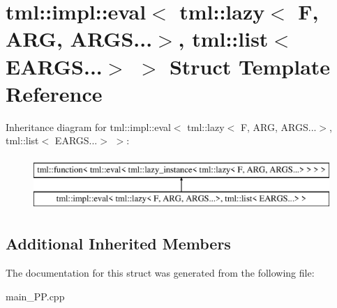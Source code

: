 \hypertarget{structtml_1_1impl_1_1eval_3_01tml_1_1lazy_3_01F_00_01ARG_00_01ARGS_8_8_8_4_00_01tml_1_1list_3_01EARGS_8_8_8_4_01_4}{\section{tml\+:\+:impl\+:\+:eval$<$ tml\+:\+:lazy$<$ F, A\+R\+G, A\+R\+G\+S...$>$, tml\+:\+:list$<$ E\+A\+R\+G\+S...$>$ $>$ Struct Template Reference}
\label{structtml_1_1impl_1_1eval_3_01tml_1_1lazy_3_01F_00_01ARG_00_01ARGS_8_8_8_4_00_01tml_1_1list_3_01EARGS_8_8_8_4_01_4}
}
Inheritance diagram for tml\+:\+:impl\+:\+:eval$<$ tml\+:\+:lazy$<$ F, A\+R\+G, A\+R\+G\+S...$>$, tml\+:\+:list$<$ E\+A\+R\+G\+S...$>$ $>$\+:\begin{figure}[H]
\begin{center}
\leavevmode
\includegraphics[height=2.000000cm]{structtml_1_1impl_1_1eval_3_01tml_1_1lazy_3_01F_00_01ARG_00_01ARGS_8_8_8_4_00_01tml_1_1list_3_01EARGS_8_8_8_4_01_4}
\end{center}
\end{figure}
\subsection*{Additional Inherited Members}


The documentation for this struct was generated from the following file\+:\begin{DoxyCompactItemize}
\item 
main\+\_\+\+P\+P.\+cpp\end{DoxyCompactItemize}

